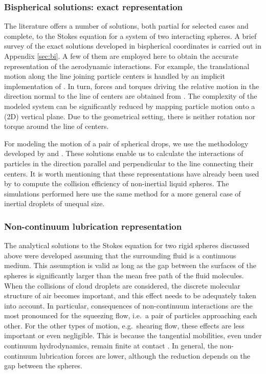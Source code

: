 \documentclass[../thesis.tex]{subfiles}
\begin{document}
\subsubsection{Bispherical solutions: exact representation}%

The literature offers a number of solutions, both partial for selected cases and complete, to the Stokes equation for a system of two interacting spheres. A brief survey of the exact solutions developed in bispherical coordinates is carried out in Appendix \ref{sec:bi}. A few of them are employed here to obtain the accurate representation of the aerodynamic interactions. For example, the translational motion along the line joining particle centers is handled by an implicit implementation of \cite{SJ26}. In turn, forces and torques driving the relative motion in the direction normal to the line of centers are obtained from \cite{ONM70}. The complexity of the modeled system can be significantly reduced by mapping particle motion onto a (2D) vertical plane. Due to the geometrical setting, there is neither rotation nor torque around the line of centers.

For modeling the motion of a pair of spherical drops, we use the methodology developed by \cite{HHS73} and \cite{Z80}. These solutions enable us to calculate the interactions of particles in the direction parallel and perpendicular to the line connecting their centers. It is worth mentioning that these representations \citep{HHS73,Z80} have already been used by \cite{Z82} to compute the collision efficiency of non-inertial liquid spheres. The simulations performed here use the same method for a more general case of inertial droplets of unequal size.


\subsubsection{Non-continuum lubrication representation}%
The analytical solutions to the Stokes equation for two rigid spheres discussed above were developed assuming that the surrounding fluid is a continuous medium. This assumption is valid as long as the gap between the surfaces of the spheres is significantly larger than the mean free path of the fluid molecules. When the collisions of cloud droplets are considered, the discrete molecular structure of air becomes important, and this effect needs to be adequately taken into account. In particular, consequences of non-continuum interactions are the most pronounced for the squeezing flow, i.e.\ a pair of particles approaching each other. For the other types of motion, e.g.\ shearing flow, these effects are less important or even negligible. This is because the tangential mobilities, even under continuum hydrodynamics, remain finite at contact \citep{DRK21a}. In general, the non-continuum lubrication forces are lower, although the reduction depends on the gap between the spheres. 
\end{document}
